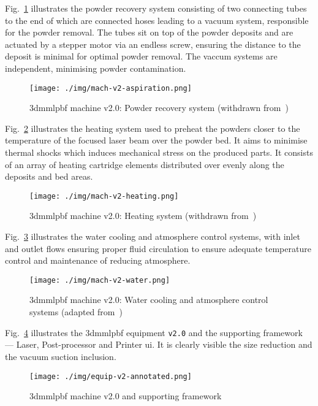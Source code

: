 Fig.~\ref{fig:mach-v2-asp} illustrates the powder recovery system consisting of
two connecting tubes to the end of which are connected hoses leading to a vacuum
system, responsible for the powder removal.
The tubes sit on top of the powder deposits and are actuated by a stepper motor
via an endless screw, ensuring the distance to the deposit is minimal for
optimal powder removal. The vaccum systems are independent, minimising powder contamination.
%
\begin{figure}[!hbt]
  \centering
    \texttt{[image: ./img/mach-v2-aspiration.png]}
  \caption[\gls{3dmmlpbf} machine v2.0: Powder recovery system]{\gls{3dmmlpbf} machine v2.0: Powder recovery system (withdrawn from~\cite{diogoTese})}%
  \label{fig:mach-v2-asp}
\end{figure}

Fig.~\ref{fig:mach-v2-heat} illustrates the heating system used to preheat the
powders closer to the temperature of the focused laser beam over the powder
bed. It aims to minimise thermal shocks which induces mechanical stress on the
produced parts. It consists of an array of heating cartridge elements
distributed over evenly along the deposits and bed areas.
%
\begin{figure}[!hbt]
  \centering
    \texttt{[image: ./img/mach-v2-heating.png]}
  \caption[\gls{3dmmlpbf} machine v2.0: Heating system]{\gls{3dmmlpbf} machine v2.0: Heating system (withdrawn from~\cite{diogoTese})}%
  \label{fig:mach-v2-heat}
\end{figure}

Fig.~\ref{fig:mach-v2-water} illustrates the water cooling and atmosphere
control systems, with inlet and outlet flows ensuring proper fluid circulation
to ensure adequate temperature control and maintenance of reducing atmosphere.
%
\begin{figure}[!hbt]
  \centering
    \texttt{[image: ./img/mach-v2-water.png]}
  \caption[\gls{3dmmlpbf} machine v2.0: Water cooling and atmosphere control systems]{\gls{3dmmlpbf} machine v2.0: Water cooling and atmosphere control systems (adapted from~\cite{diogoTese})}%
  \label{fig:mach-v2-water}
\end{figure}

Fig.~\ref{fig:equip-v2-annotated} illustrates the \gls{3dmmlpbf} equipment
\texttt{v2.0} and the supporting framework --- Laser, Post-processor and
Printer \gls{ui}. It is clearly visible the size reduction and the vacuum
suction inclusion.
%
\begin{figure}[!hbt]
  \centering
    \texttt{[image: ./img/equip-v2-annotated.png]}
  \caption{\gls{3dmmlpbf} machine v2.0 and supporting framework}%
  \label{fig:equip-v2-annotated}
\end{figure}

